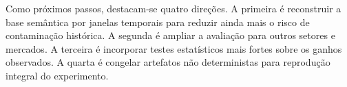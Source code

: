 \documentclass[12pt]{article}
\begin{document}
Como próximos passos, destacam-se quatro direções. A primeira é reconstruir a base semântica por janelas temporais para reduzir ainda mais o risco de contaminação histórica. A segunda é ampliar a avaliação para outros setores e mercados. A terceira é incorporar testes estatísticos mais fortes sobre os ganhos observados. A quarta é congelar artefatos não deterministas para reprodução integral do experimento.



\end{document}
